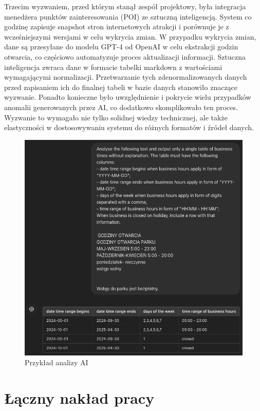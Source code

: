 Trzecim wyzwaniem, przed którym stanął zespół projektowy, była integracja menedżera punktów zainteresowania (POI) ze sztuczną inteligencją.
System co godzinę zapisuje snapshot stron internetowych atrakcji i porównuje je z wcześniejszymi wersjami w celu wykrycia zmian.
W przypadku wykrycia zmian, dane są przesyłane do modelu GPT-4 od OpenAI w celu ekstrakcji godzin otwarcia, co częściowo automatyzuje proces aktualizacji informacji.
Sztuczna inteligencja zwraca dane w formacie tabelki markdown z wartościami wymagającymi normalizacji.
Przetwarzanie tych zdenormalizowanych danych przed zapisaniem ich do finalnej tabeli w bazie danych stanowiło znaczące wyzwanie.
Ponadto konieczne było uwzględnienie i pokrycie wielu przypadków anomalii generowanych przez AI, co dodatkowo skomplikowało ten proces.
Wyzwanie to wymagało nie tylko solidnej wiedzy technicznej, ale także elastyczności w dostosowywaniu systemu do różnych formatów i źródeł danych.

\begin{figure}[H]
    \centering
    \includegraphics[width=1\textwidth]{attachments/t2}
    \caption{Przykład analizy AI}
\end{figure}

\section{Łączny nakład pracy}
\label{sec:laczny-naklad-pracy}


